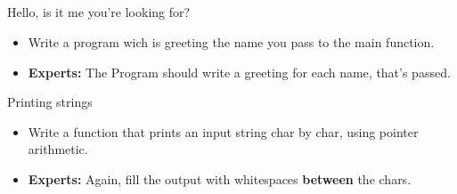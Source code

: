 \subsection{}
\begin{frame}{Hello, is it me you're looking for?}
	\begin{itemize}
		\item Write a program wich is greeting the name you pass to the main function.
		\item \textbf{Experts:} The Program should write a greeting for each name, that's passed.
	\end{itemize}
\end{frame}
\begin{frame}{Printing strings}
	\begin{itemize}
		\item Write a function that prints an input string char by char, using pointer arithmetic.
		\item \textbf{Experts:} Again, fill the output with whitespaces \textbf{between} the chars.
	\end{itemize}		
\end{frame}



